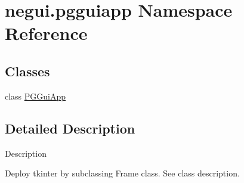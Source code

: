 \hypertarget{namespacenegui_1_1pgguiapp}{}\section{negui.\+pgguiapp Namespace Reference}
\label{namespacenegui_1_1pgguiapp}
\subsection*{Classes}
\begin{DoxyCompactItemize}
\item 
class \hyperlink{classnegui_1_1pgguiapp_1_1PGGuiApp}{P\+G\+Gui\+App}
\end{DoxyCompactItemize}


\subsection{Detailed Description}
\begin{DoxyVerb}Description

Deploy tkinter by subclassing Frame class.  See class description.
\end{DoxyVerb}
 